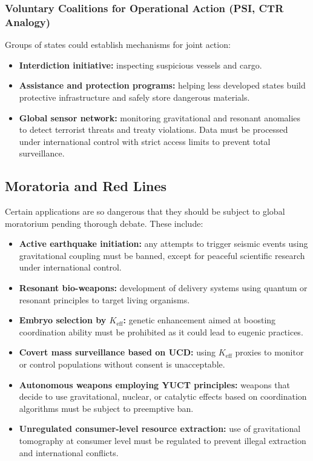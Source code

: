 \documentclass[12pt,a4paper]{article}
\theoremstyle{remark}
\newcommand{\Keff}{K_{\mathrm{eff}}}
\begin{document}
	\subsubsection{Voluntary Coalitions for Operational Action (PSI, CTR Analogy)}
	
	Groups of states could establish mechanisms for joint action:
	\begin{itemize}
		\item \textbf{Interdiction initiative:} inspecting suspicious vessels and cargo.
		\item \textbf{Assistance and protection programs:} helping less developed states build protective infrastructure and safely store dangerous materials.
		\item \textbf{Global sensor network:} monitoring gravitational and resonant anomalies to detect terrorist threats and treaty violations. Data must be processed under international control with strict access limits to prevent total surveillance.
	\end{itemize}
	
	\subsection{Moratoria and Red Lines}
	\label{subsec:redlines}
	
	Certain applications are so dangerous that they should be subject to global moratorium pending thorough debate. These include:
	\begin{itemize}[leftmargin=*]
		\item \textbf{Active earthquake initiation:} any attempts to trigger seismic events using gravitational coupling must be banned, except for peaceful scientific research under international control.
		\item \textbf{Resonant bio-weapons:} development of delivery systems using quantum or resonant principles to target living organisms.
		\item \textbf{Embryo selection by \(\Keff\):} genetic enhancement aimed at boosting coordination ability must be prohibited as it could lead to eugenic practices.
		\item \textbf{Covert mass surveillance based on UCD:} using \(\Keff\) proxies to monitor or control populations without consent is unacceptable.
		\item \textbf{Autonomous weapons employing YUCT principles:} weapons that decide to use gravitational, nuclear, or catalytic effects based on coordination algorithms must be subject to preemptive ban.
		\item \textbf{Unregulated consumer-level resource extraction:} use of gravitational tomography at consumer level must be regulated to prevent illegal extraction and international conflicts.
	\end{itemize}
	
\end{document}
